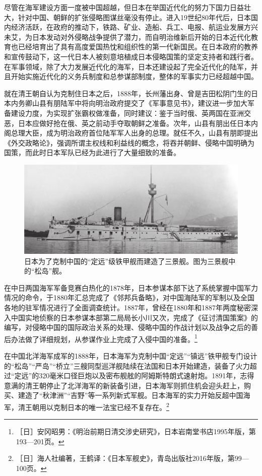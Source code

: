 \documentclass[12pt,UTF8]{ctexbook}
\begin{document}
尽管在海军建设方面一度被中国超越，但日本在举国近代化的努力下国力日益壮大，针对中国、朝鲜的扩张侵略图谋丝毫没有停止。进入19世纪80年代后，日本国内经济活跃，在政府的推动下，铁路、矿业、造船、兵工、电报、航运业发展方兴未艾，为日本发动对外侵略战争提供了潜力，而自明治维新后开始的日本近代化教育也已经培育出了具有高度爱国热忱和组织性的第一代新国民。在日本政府的教养和宣传鼓动下，这一代日本人被刻意培植成日本侵略国策的坚定支持者和践行者。在军事领域，除了大力发展近代化的海军，日本还建设起了完全近代化的陆军，并且开始实施近代化的义务兵制度和总参谋部制度，整体的军事实力已经超越中国。

就在清王朝自认为克制住日本之后，1888年，长州藩出身、曾是吉田松阴门生的日本内务卿山县有朋陆军中将向明治政府提交了《军事意见书》，建议进一步加大军备建设力度，为实现扩张霸权做准备，同时建议：鉴于当时俄、英两国在亚洲交恶，日本应做好抢在俄、英之前动手夺取朝鲜之准备。次年，山县有朋出任日本内阁总理大臣，成为明治政府首位陆军军人出身的总理。就任不久，山县有朋即提出《外交政略论》，强调所谓主权线和利益线的概念，将吞并朝鲜、侵略中国明确为国策，而此时日本军队已经为此进行了大量细致的准备。

\begin{figure}[htbp]
	\centering
	\includegraphics[width=0.7\linewidth]{5}
	\caption{日本为了克制中国的“定远”级铁甲舰而建造了三景舰。图为三景舰中的“松岛”舰。}
	\label{fig:1}
\end{figure}

在中日两国海军军备竞赛白热化的1878年，日本参谋本部下达了系统掌握中国军力情况的命令，于1880年汇总完成了《邻邦兵备略》，对中国海陆军的军制以及全国各地的驻军情况进行了全面调查统计。1887年，曾经在1880年和1887年两度秘密深入中国实地侦察的日本参谋本部第二局局长小川又次，完成了《征讨清国策案》的编写，对侵略中国的国际政治关系的处理、侵略中国的作战计划以及战争之后的善后办法做了详细规划，从参谋作业上完成了入侵中国的准备。\footnote{［日］安冈昭男：《明治前期日清交涉史研究》，日本岩南堂书店1995年版，第193—201页。}

在中国北洋海军成军的1888年，日本海军为克制中国“定远”“镇远”铁甲舰专门设计的“松岛”“严岛”“桥立”三艘同型巡洋舰陆续在法国和日本开始建造，装备了火力超过“定远”的320毫米口径巨炮以及密布舰舷的阿姆斯特朗式速射炮。1891年，志得意满的清王朝停止了北洋海军的新装备引进，日本海军则抓住机会迎头赶上，购买、建造了“秋津洲”“吉野”等一系列新式军舰。日本海军的实力开始反超中国海军，清王朝用以克制日本的唯一法宝已经不复存在。\footnote{［日］海人社编著，王鹤译：《日本军舰史》，青岛出版社2016年版，第99—100页。}
\end{document}
